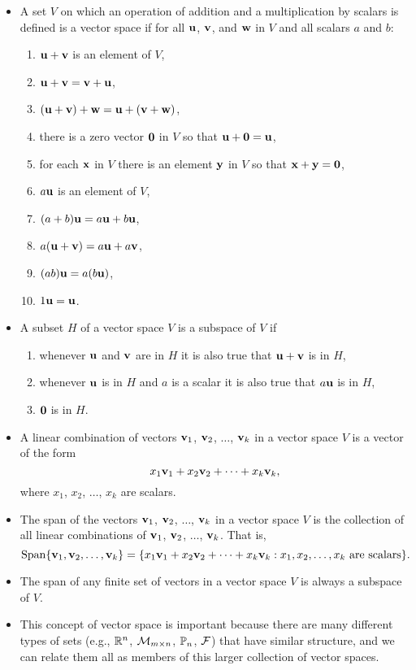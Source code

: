 \label{sec:vec_space_summ}

\begin{itemize}
\item  A set $V$ on which an operation of addition and a multiplication by scalars is defined is a vector space if for all $\mathbf{u}$, $\mathbf{v}$, and $\mathbf{w}$ in $V$ and all scalars $a$ and $b$:
\begin{enumerate}
\item $\mathbf{u} + \mathbf{v}$ is an element of $V$,
\item $\mathbf{u} + \mathbf{v} = \mathbf{v} + \mathbf{u}$,
\item $(\mathbf{u} + \mathbf{v}) + \mathbf{w} = \mathbf{u} + (\mathbf{v} + \mathbf{w})$,
\item there is a zero vector $\mathbf{0}$ in $V$ so that $\mathbf{u} + \mathbf{0} = \mathbf{u}$,
\item for each $\mathbf{x}$ in $V$ there is an element $\mathbf{y}$ in $V$ so that $\mathbf{x} + \mathbf{y} = \mathbf{0}$,
\item $a \mathbf{u}$ is an element of $V$,
\item $(a+b) \mathbf{u} = a\mathbf{u} + b\mathbf{u}$,
\item $a(\mathbf{u} + \mathbf{v}) = a\mathbf{u} + a\mathbf{v}$,
\item $(ab) \mathbf{u} = a(b\mathbf{u})$,
\item $1 \mathbf{u} = \mathbf{u}$.
\end{enumerate}
\item A subset $H$ of a vector space $V$ is a subspace of $V$ if
\begin{enumerate}
\item whenever $\mathbf{u}$ and $\mathbf{v}$ are in $H$ it is also true that $\mathbf{u} + \mathbf{v}$ is in $H$,
\item whenever $\mathbf{u}$ is in $H$ and $a$ is a scalar it is also true that $a\mathbf{u}$ is in $H$,
\item $\mathbf{0}$ is in $H$.
\end{enumerate}
\item A linear combination of vectors $\mathbf{v}_1$, $\mathbf{v}_2$, $\ldots$, $\mathbf{v}_k$ in a vector space $V$ is a vector of the form 
\[x_1\mathbf{v}_1+x_2\mathbf{v}_2 + \cdots + x_k \mathbf{v}_k,\]
where $x_1$, $x_2$, $\ldots$, $x_k$ are scalars. 
\item The span of the vectors $\mathbf{v}_1$, $\mathbf{v}_2$, $\ldots$, $\mathbf{v}_k$ in a vector space $V$ is the collection of all linear combinations of $\mathbf{v}_1$, $\mathbf{v}_2$, $\ldots$, $\mathbf{v}_k$. That is,
\[\text{Span}\{\mathbf{v}_1, \mathbf{v}_2, \ldots, \mathbf{v}_k\} = \{x_1\mathbf{v}_1+x_2\mathbf{v}_2 + \cdots + x_k \mathbf{v}_k : x_1, x_2, \ldots, x_k \text{ are scalars}\}.\]
\item The span of any finite set of vectors in a vector space $V$ is always a subspace of $V$. 
\item This concept of vector space is important because there are many different types of sets (e.g., $\mathbb{R}^n$, $\mathcal{M}_{m \times n}$, $\mathbb{P}_n$, $\mathcal{F}$) that have similar structure, and we can relate them all as members of this larger collection of vector spaces. 
\end{itemize}


